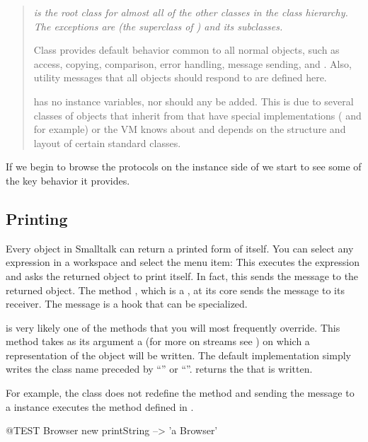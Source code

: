 \documentclass[a4paper,10pt,twoside]{book}
\begin{document}
\begin{quote}\itshape
     is the root class for almost all of the other classes in the class hierarchy.
    The exceptions are  (the superclass of ) and its subclasses.
    
    Class  provides default behavior common to all normal objects, such as access, copying, comparison, error handling, message sending, and .
    Also, utility messages that all objects should respond to are defined here.
    
     has no instance variables, nor should any be added.
    This is due to several classes of objects that inherit from  that have special implementations ( and  for example) or the VM knows about and depends on the structure and layout of certain standard classes.
\end{quote}

If we begin to browse the protocols on the instance side of  we start to see some of the key behavior it provides.

\subsection{Printing}
Every object in Smalltalk can return a printed form of itself.
You can select any expression in a workspace and select the  menu item:
This executes the expression and asks the returned object to print itself.
In fact, this sends the message  to the returned object.
The method , which is a , at its core sends the message  to its receiver.
The message  is a hook that can be specialized. 

 is very likely one of the methods that you will most frequently override.
This method takes as its argument a  (for more on streams see ) on which a  representation of the object will be written.
The default implementation simply writes the class name preceded by ``'' or ``''.
 returns the  that is written.

For example, the class  does not redefine the method  and sending the message  to a  instance executes the method defined in . 
\begin{code}{@TEST}
Browser new printString --> 'a Browser'
\end{code}
\end{document}
